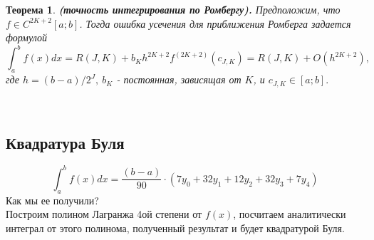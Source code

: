 \documentclass[14pt, titlepage, a4paper]{extarticle} %
\newtheorem{theorem}{Теорема}
\begin{document}
	\begin{theorem}\label{th:7}
		\textbf{(точность интегрирования по Ромбергу).} Предположим, что $f \in C^{2K+2}[a;b]$. Тогда ошибка усечения для приближения Ромберга задается формулой
		\begin{equation}\label{eq:34}
			\int_{a}^{b}{f(x)dx} = R(J,K) + b_Kh^{2K+2}f^{(2K+2)}(c_{J,K}) = R(J,K) + O(h^{2K+2}),
		\end{equation}	
		где $h = (b-a)/2^J,~b_K$ - постоянная, зависящая от $K$, и $c_{J,K}\in[a;b].$
	\end{theorem}
	
	
	~\\
	\subsection*{Квадратура Буля}
	
	\begin{equation}
	\nonumber
	\int_{a}^{b}{f(x)dx} = \frac{(b-a)}{90}\cdot(7y_0+32y_1+12y_2+32y_3+7y_4)
	\end{equation}
	Как мы ее получили?\\
	Построим полином Лагранжа 4ой степени от $f(x)$, посчитаем аналитически интеграл от этого полинома, полученный результат и будет квадратурой Буля.
	
\end{document}
